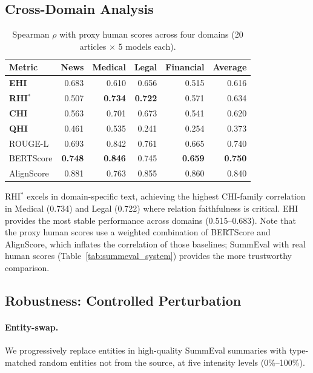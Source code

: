 \documentclass[11pt]{article}
\begin{document}
\subsection{Cross-Domain Analysis}

\begin{table}[h]
\centering
\caption{Spearman $\rho$ with proxy human scores across four domains (20 articles $\times$ 5 models each).}
\label{tab:crossdomain}
\begin{tabular}{lrrrrr}
\toprule
\textbf{Metric} & \textbf{News} & \textbf{Medical} & \textbf{Legal} & \textbf{Financial} & \textbf{Average} \\
\midrule
\textbf{EHI} & 0.683 & 0.610 & 0.656 & 0.515 & 0.616 \\
\textbf{RHI$^*$} & 0.507 & \textbf{0.734} & \textbf{0.722} & 0.571 & 0.634 \\
\textbf{CHI} & 0.563 & 0.701 & 0.673 & 0.541 & 0.620 \\
\textbf{QHI} & 0.461 & 0.535 & 0.241 & 0.254 & 0.373 \\
\midrule
ROUGE-L & 0.693 & 0.842 & 0.761 & 0.665 & 0.740 \\
BERTScore & \textbf{0.748} & \textbf{0.846} & 0.745 & \textbf{0.659} & \textbf{0.750} \\
AlignScore & 0.881 & 0.763 & 0.855 & 0.860 & 0.840 \\
\bottomrule
\end{tabular}
\end{table}

RHI$^*$ excels in domain-specific text, achieving the highest CHI-family correlation in Medical (0.734) and Legal (0.722) where relation faithfulness is critical. EHI provides the most stable performance across domains (0.515--0.683). Note that the proxy human scores use a weighted combination of BERTScore and AlignScore, which inflates the correlation of those baselines; SummEval with real human scores (Table~\ref{tab:summeval_system}) provides the more trustworthy comparison.


\subsection{Robustness: Controlled Perturbation}

\paragraph{Entity-swap.} We progressively replace entities in high-quality SummEval summaries with type-matched random entities not from the source, at five intensity levels (0\%--100\%).
\end{document}
